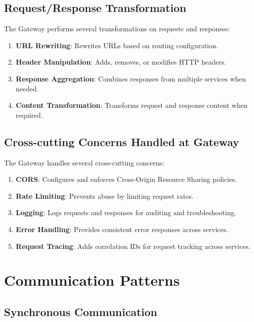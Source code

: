 \subsection{Request/Response Transformation}

The Gateway performs several transformations on requests and responses:

\begin{enumerate}
   \item \textbf{URL Rewriting}: Rewrites URLs based on routing configuration.
   \item \textbf{Header Manipulation}: Adds, removes, or modifies HTTP headers.
   \item \textbf{Response Aggregation}: Combines responses from multiple services when needed.
   \item \textbf{Content Transformation}: Transforms request and response content when required.
\end{enumerate}

\subsection{Cross-cutting Concerns Handled at Gateway}

The Gateway handles several cross-cutting concerns:

\begin{enumerate}
   \item \textbf{CORS}: Configures and enforces Cross-Origin Resource Sharing policies.
   \item \textbf{Rate Limiting}: Prevents abuse by limiting request rates.
   \item \textbf{Logging}: Logs requests and responses for auditing and troubleshooting.
   \item \textbf{Error Handling}: Provides consistent error responses across services.
   \item \textbf{Request Tracing}: Adds correlation IDs for request tracking across services.
\end{enumerate}

\section{Communication Patterns}

\subsection{Synchronous Communication}

